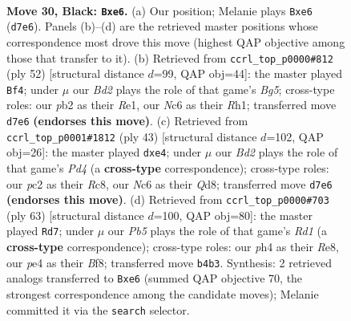 \documentclass[11pt]{article}
\begin{document}
\begin{figure}[p]\centering
\begin{subfigure}{0.46\textwidth}\centering
\resizebox{\linewidth}{!}{%
\newchessgame
\chessboard[
  setfen={r3k2r/1q1b2bp/p1npN1p1/4p1P1/1p2P1QP/5P1B/PPPK1B2/R1R5 b - - 0 30},
  showmover=false,
  pgfstyle=straightmove, color=movearrow, markmove={d7-e6}
]}
\caption{}
\end{subfigure}\hfill
\begin{subfigure}{0.46\textwidth}\centering
\resizebox{\linewidth}{!}{%
\newchessgame
\chessboard[
  setfen={r3r1k1/2pnqpp1/1p1p1bp1/3P2B1/1PP1P2P/p4BP1/P1Q3K1/4R2R w - - 4 27},
  showmover=false,
  pgfstyle=straightmove, color=movearrow, markmove={g5-f4}
]}
\caption{}
\end{subfigure}
\\[4pt]
\begin{subfigure}{0.46\textwidth}\centering
\resizebox{\linewidth}{!}{%
\newchessgame
\chessboard[
  setfen={2rqr1k1/1b1n1pp1/2p4p/p2p4/1p1PN3/1P1Q2P1/PB3PBP/2RR2K1 b - - 0 22},
  showmover=false,
  pgfstyle=straightmove, color=movearrow, markmove={d5-e4}
]}
\caption{}
\end{subfigure}\hfill
\begin{subfigure}{0.46\textwidth}\centering
\resizebox{\linewidth}{!}{%
\newchessgame
\chessboard[
  setfen={3rrbk1/5p2/2p1n1qp/3pPNp1/1p1P4/pP3P2/P4BPP/1Q1RR1K1 b - - 0 32},
  showmover=false,
  pgfstyle=straightmove, color=movearrow, markmove={d8-d7}
]}
\caption{}
\end{subfigure}
\caption{\textbf{Move 30, Black: \texttt{Bxe6}.} (a) Our position; Melanie plays \texttt{Bxe6} (\texttt{d7e6}). Panels (b)--(d) are the retrieved master positions whose correspondence most drove this move (highest QAP objective among those that transfer to it). (b) Retrieved from \texttt{ccrl\_top\_p0000\#812} (ply 52) [structural distance $d$=99, QAP obj=44]: the master played \texttt{Bf4}; under $\mu$ our \emph{Bd2} plays the role of that game's \emph{Bg5}; cross-type roles: our \emph{p}b2 as their \emph{R}e1, our \emph{N}c6 as their \emph{R}h1; transferred move \texttt{d7e6} \textbf{(endorses this move)}. (c) Retrieved from \texttt{ccrl\_top\_p0001\#1812} (ply 43) [structural distance $d$=102, QAP obj=26]: the master played \texttt{dxe4}; under $\mu$ our \emph{Bd2} plays the role of that game's \emph{Pd4} (a \textbf{cross-type} correspondence); cross-type roles: our \emph{p}c2 as their \emph{R}c8, our \emph{N}c6 as their \emph{Q}d8; transferred move \texttt{d7e6} \textbf{(endorses this move)}. (d) Retrieved from \texttt{ccrl\_top\_p0000\#703} (ply 63) [structural distance $d$=100, QAP obj=80]: the master played \texttt{Rd7}; under $\mu$ our \emph{Pb5} plays the role of that game's \emph{Rd1} (a \textbf{cross-type} correspondence); cross-type roles: our \emph{p}h4 as their \emph{R}e8, our \emph{p}e4 as their \emph{B}f8; transferred move \texttt{b4b3}. Synthesis: 2 retrieved analogs transferred to \texttt{Bxe6} (summed QAP objective 70, the strongest correspondence among the candidate moves); Melanie committed it via the \texttt{search} selector.}
\label{fig:thought-m59}
\end{figure}
\end{document}
